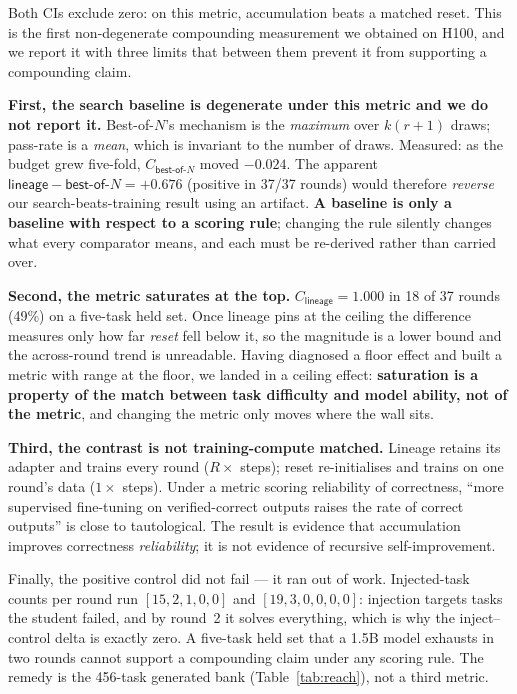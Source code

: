 \noindent Both CIs exclude zero: on this metric, accumulation beats a matched reset. This is the
first non-degenerate compounding measurement we obtained on H100, and we report it with three
limits that between them prevent it from supporting a compounding claim.

\textbf{First, the search baseline is degenerate under this metric and we do not report it.}
Best-of-$N$'s mechanism is the \emph{maximum} over $k(r{+}1)$ draws; pass-rate is a
\emph{mean}, which is invariant to the number of draws. Measured: as the budget grew
five-fold, $C_{\textsf{best-of-}N}$ moved $-0.024$. The apparent
$\textsf{lineage}-\textsf{best-of-}N = +0.676$ (positive in 37/37 rounds) would therefore
\emph{reverse} our search-beats-training result using an artifact. \textbf{A baseline is only a
baseline with respect to a scoring rule}; changing the rule silently changes what every
comparator means, and each must be re-derived rather than carried over.

\textbf{Second, the metric saturates at the top.} $C_{\textsf{lineage}} = 1.000$ in 18 of 37
rounds (49\%) on a five-task held set. Once lineage pins at the ceiling the difference measures
only how far \emph{reset} fell below it, so the magnitude is a lower bound and the
across-round trend is unreadable. Having diagnosed a floor effect and built a metric with range
at the floor, we landed in a ceiling effect: \textbf{saturation is a property of the match
between task difficulty and model ability, not of the metric}, and changing the metric only
moves where the wall sits.

\textbf{Third, the contrast is not training-compute matched.} Lineage retains its adapter and
trains every round ($R \times$ steps); reset re-initialises and trains on one round's data
($1 \times$ steps). Under a metric scoring reliability of correctness, ``more supervised
fine-tuning on verified-correct outputs raises the rate of correct outputs'' is close to
tautological. The result is evidence that accumulation improves correctness \emph{reliability};
it is not evidence of recursive self-improvement.

Finally, the positive control did not fail --- it ran out of work. Injected-task counts per
round run $[15,2,1,0,0]$ and $[19,3,0,0,0,0]$: injection targets tasks the student failed, and
by round~2 it solves everything, which is why the inject--control delta is exactly zero. A
five-task held set that a 1.5B model exhausts in two rounds cannot support a compounding claim
under any scoring rule. The remedy is the 456-task generated bank (Table~\ref{tab:reach}), not
a third metric.

